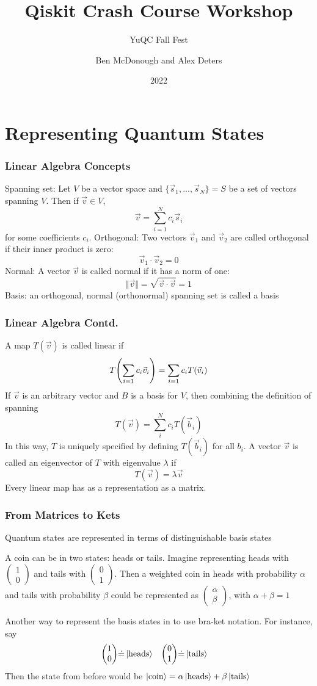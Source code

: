 \documentclass{beamer}
\title{Qiskit Crash Course Workshop}
\subtitle{YuQC Fall Fest}
\author{Ben McDonough and Alex Deters}
\date{2022}
\begin{document}
\frame{\titlepage}

\section{Representing Quantum States}
\begin{frame}
\frametitle{Linear Algebra Concepts}
 Spanning set: Let $V$ be a vector space and $\{\vec s_1,...,\vec s_N\} = S$ be a set of vectors spanning $V$. Then if $\vec v \in V$, 
$$
\vec v = \sum_{i=1}^N c_i \vec s_i
$$
for some coefficients $c_i$.
Orthogonal: Two vectors $\vec v_1$ and $\vec v_2$ are called orthogonal if their inner product is zero: $$
\vec v_1 \cdot \vec v_2 = 0
$$
Normal: A vector $\vec v$ is called normal if it has a norm of one:
$$
\Vert \vec v \Vert = \sqrt{\vec v \cdot \vec v} =  1
$$
Basis: an orthogonal, normal (orthonormal) spanning set is called a basis
\end{frame}
\begin{frame}
\frametitle{Linear Algebra Contd.}
A map $T(\vec v)$ is called linear if
$$
T\qty(\sum_{i=1} c_i \vec v_i) = \sum_{i=1}c_i T(\vec v_i)
$$
If $\vec v$ is an arbitrary vector and $B$ is a basis for $V$, then combining the definition of spanning
$$
T(\vec v) = \sum_{i}^N c_i T(\vec b_i)
$$
In this way, $T$ is uniquely specified by defining $T(\vec b_i)$ for all $b_i$. 
A vector $\vec v$ is called an eigenvector of $T$ with eigenvalue $\lambda$ if
$$
T(\vec v) = \lambda \vec v
$$
Every linear map has as a representation as a matrix.
\end{frame}
\begin{frame}
\frametitle{From Matrices to Kets}
Quantum states are represented in terms of distinguishable basis states
\begin{example}
A coin can be in two states: heads or tails. Imagine representing heads with $\begin{pmatrix}1 \\ 0 \end{pmatrix}$ and tails with $\begin{pmatrix}0 \\ 1 \end{pmatrix}$. Then a weighted coin in heads with probability $\alpha$ and tails with probability $\beta$ could be represented as $\begin{pmatrix} \alpha \\ \beta \end{pmatrix}$, with $\alpha + \beta = 1$
\end{example}
Another way to represent the basis states in to use bra-ket notation. For instance, say
\begin{align*}
\begin{pmatrix}1 \\ 0 \end{pmatrix} &\dot = \ket{\text{heads}} & \begin{pmatrix} 0 \\ 1 \end{pmatrix} &\dot = \ket{\text{tails}}
\end{align*}
Then the state from before would be $\ket{\text{coin}} = \alpha \ket{\text{heads}}+\beta \ket{\text{tails}}$
\end{frame}
\end{document}
